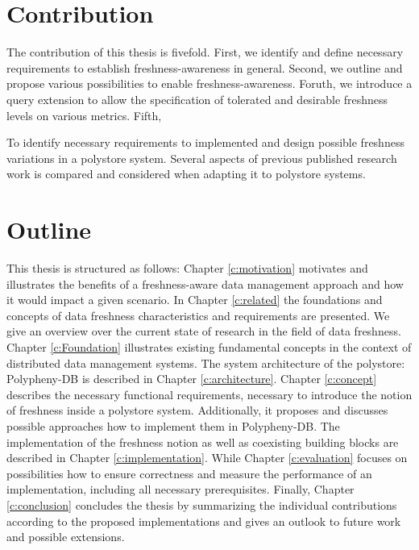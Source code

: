 
\section{Contribution}
The contribution of this thesis is fivefold. First, we identify and define necessary requirements to establish freshness-awareness in general.
Second, we outline and propose various possibilities to enable freshness-awareness. Foruth, we introduce a query extension to allow the specification
of tolerated and desirable freshness levels on various metrics. Fifth, 

To identify necessary requirements to implemented and design possible 
freshness variations in a polystore system. Several aspects of previous published research work is compared and considered when adapting it to polystore systems.



\section{Outline}
This thesis is structured as follows:
Chapter \ref{c:motivation} motivates and illustrates the benefits of a freshness-aware data management approach and how it would impact a given scenario.
In Chapter \ref{c:related} the foundations and concepts of data freshness characteristics and requirements are presented.
We give an overview over the current state of research in the field of data freshness. 
Chapter \ref{c:Foundation} illustrates existing fundamental concepts in the context of distributed data management systems. 
The system architecture of the polystore: Polypheny-DB is described in Chapter \ref{c:architecture}.
Chapter \ref{c:concept} describes the necessary functional requirements, necessary to introduce the notion of freshness inside a polystore system. Additionally, 
it proposes and discusses possible approaches how to implement them in Polypheny-DB. 
The implementation of the freshness notion as well as coexisting building blocks are described in Chapter \ref{c:implementation}.
While Chapter \ref{c:evaluation} focuses on possibilities how to ensure correctness and measure the performance of an implementation, including all necessary prerequisites.
Finally, Chapter \ref{c:conclusion} concludes the thesis by summarizing the individual contributions according to the proposed
implementations and gives an outlook to future work and possible extensions.


